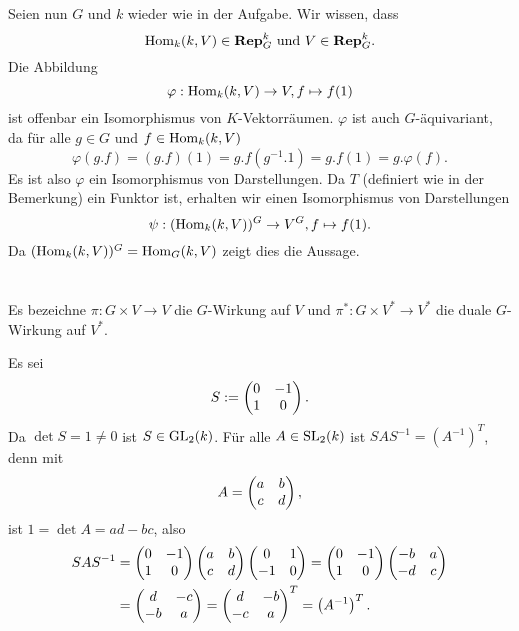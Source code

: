 \documentclass[a4paper,10pt]{article}
\begin{document}
Seien nun $G$ und $k$ wieder wie in der Aufgabe. Wir wissen, dass
\[
 \operatorname{Hom}_k(k,V) \in \mathbf{Rep}_G^k \text{ und } V \in \mathbf{Rep}_G^k.
\]
Die Abbildung 
\[
 \varphi: \operatorname{Hom}_k(k,V) \to V, f \mapsto f(1)
\]
ist offenbar ein Isomorphismus von $K$-Vektorräumen. $\varphi$ ist auch $G$-äquivariant, da für alle $g \in G$ und $f \in \operatorname{Hom}_k(k,V)$
\[
 \varphi(g.f) = (g.f)(1) = g.f(g^{-1}.1) = g.f(1) = g.\varphi(f).
\]
Es ist also $\varphi$ ein Isomorphismus von Darstellungen. Da $T$ (definiert wie in der Bemerkung) ein Funktor ist, erhalten wir einen Isomorphismus von Darstellungen
\[
 \psi : (\operatorname{Hom}_k(k,V))^G \to V^G, f \mapsto f(1).
\]
Da $(\operatorname{Hom}_k(k,V))^G = \operatorname{Hom}_G(k,V)$ zeigt dies die Aussage.





\section{}
Es bezeichne $\pi : G \times V \to V$ die $G$-Wirkung auf $V$ und $\pi^* : G \times V^* \to V^*$ die duale $G$-Wirkung auf $V^*$.

Es sei
\[
 S := \begin{pmatrix}0 & -1 \\ 1 & 0\end{pmatrix}.
\]
Da $\det S = 1 \neq 0$ ist $S \in \operatorname{GL}_2(k)$. Für alle $A \in \operatorname{SL}_2(k)$ ist $SAS^{-1} = (A^{-1})^T$, denn mit
\[
 A = \begin{pmatrix}a & b \\ c & d\end{pmatrix},
\]
ist $1 = \det A = ad-bc$, also
\begin{align*}
 SAS^{-1}
 &= \begin{pmatrix}0 & -1 \\ 1 & 0\end{pmatrix} \begin{pmatrix}a & b \\ c & d\end{pmatrix} \begin{pmatrix}0 & 1 \\ -1 & 0\end{pmatrix}
 = \begin{pmatrix}0 & -1 \\ 1 & 0\end{pmatrix} \begin{pmatrix}-b & a \\ -d & c\end{pmatrix} \\
 &= \begin{pmatrix}d & -c \\ -b & a\end{pmatrix}
 = \begin{pmatrix}d & -b \\ -c & a\end{pmatrix}^T
 = \left(A^{-1}\right)^T.
\end{align*}
\end{document}
